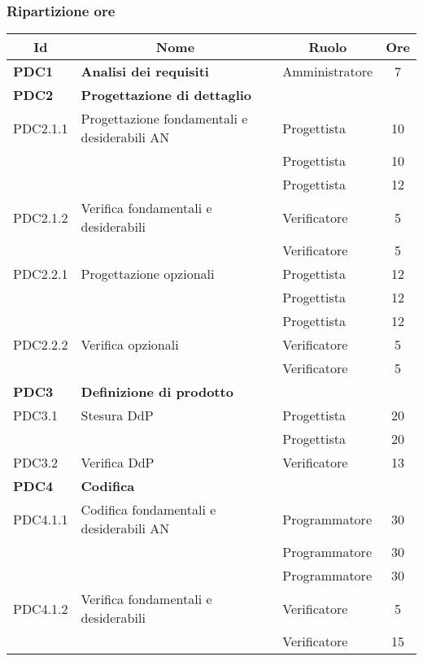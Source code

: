 \subsubsection{Ripartizione ore}

\begin{table}[H]
	\centering
	\begin{tabular}{ l l l c  }
	\hline
	\multicolumn{1}{c}{\textbf{Id}} & 
	\multicolumn{1}{c}{\textbf{Nome}} & 
	\multicolumn{1}{c}{\textbf{Ruolo}}& 
	\multicolumn{1}{c}{\textbf{Ore}} \\
	\hline
	
	\textbf{PDC1} & \textbf{Analisi dei requisiti} & Amministratore & 7\\

	\hline
	\textbf{PDC2} & \textbf{Progettazione di dettaglio} \\
	\cline{3-4}
	PDC2.1.1 & Progettazione fondamentali e desiderabili AN & Progettista & 10\\ 
    & & Progettista & 10\\
    & & Progettista & 12\\
    \cline{3-4}
	PDC2.1.2 & Verifica fondamentali e desiderabili & Verificatore & 5\\
	& & Verificatore & 5\\
	\cline{3-4}
	PDC2.2.1 & Progettazione opzionali & Progettista & 12\\ 
    & & Progettista & 12\\
    & & Progettista & 12\\
	\cline{3-4}
	PDC2.2.2 & Verifica opzionali & Verificatore & 5\\	
	& & Verificatore & 5\\
	\hline
	\textbf{PDC3} & \textbf{Definizione di prodotto} \\
	\cline{3-4}
	PDC3.1 & Stesura DdP & Progettista & 20\\ 
	 & & Progettista & 20\\
    \cline{3-4}
	PDC3.2 & Verifica DdP & Verificatore &  13\\
	\hline
	\textbf{PDC4} & \textbf{Codifica} \\
	\cline{3-4}
	PDC4.1.1 & Codifica fondamentali e desiderabili AN & Programmatore & 30\\ 
    & & Programmatore & 30\\
    & & Programmatore & 30\\
    \cline{3-4}
	PDC4.1.2 & Verifica fondamentali e desiderabili & Verificatore & 5\\
	& & Verificatore & 15\\

\end{tabular}
\end{table}
